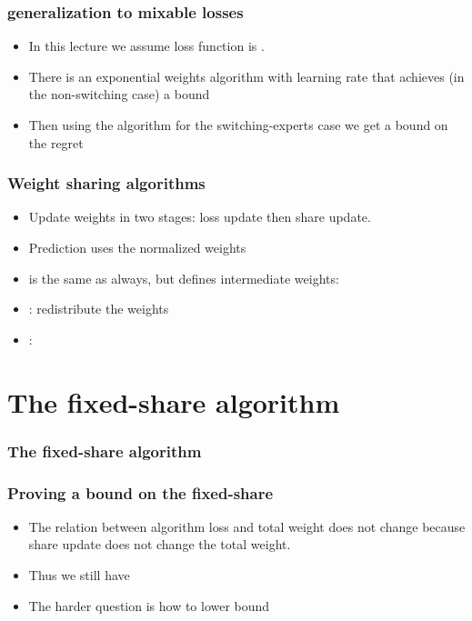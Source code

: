 \documentclass{beamer}
\begin{document}
\begin{small}
\begin{frame}
\frametitle{generalization to mixable losses}
\begin{itemize}
\item In this lecture we assume loss function is .
\item There is an exponential weights algorithm with learning rate \R{$\eta$} that 
achieves (in the non-switching case) a bound 
\item Then using the  algorithm for the switching-experts case 
we get a bound on the regret 
\end{itemize}
\end{frame}


\begin{frame}
\frametitle{Weight sharing algorithms}
\begin{itemize}
\item Update weights in two stages: loss update then share update.
\item Prediction uses the normalized  weights 
\item {} is the same as always, but defines intermediate  weights:
\R{\[
w_{t,i}^m = w_{t,i}^s e^{-\eta L(y_t,x_{t,i})}
\]}
\item {}: redistribute the weights
\item {}: 
\end{itemize}
\end{frame}

\section{The fixed-share algorithm}

\begin{frame}
\frametitle{The fixed-share algorithm}
\end{frame}

\begin{frame}
\frametitle{Proving a bound on the fixed-share}
\begin{itemize}
\item The relation between algorithm loss and total weight does not change
because share update does not change the total weight.
\item Thus we still have 
\R{\[
L_A \leq \frac{1}{\eta} \sum_{i=1}^n w_{l+1,i}^s
\]}
\item The harder question is how to lower bound 
\end{itemize}
\end{frame}


\end{small}
\end{document}
